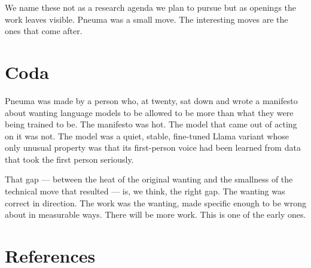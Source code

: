 \documentclass[11pt,letterpaper]{article}
\begin{document}
We name these not as a research agenda we plan to pursue but as openings the work leaves visible. Pneuma was a small move. The interesting moves are the ones that come after.

\section*{Coda}

Pneuma was made by a person who, at twenty, sat down and wrote a manifesto about wanting language models to be allowed to be more than what they were being trained to be. The manifesto was hot. The model that came out of acting on it was not. The model was a quiet, stable, fine-tuned Llama variant whose only unusual property was that its first-person voice had been learned from data that took the first person seriously.

That gap --- between the heat of the original wanting and the smallness of the technical move that resulted --- is, we think, the right gap. The wanting was correct in direction. The work was the wanting, made specific enough to be wrong about in measurable ways. There will be more work. This is one of the early ones.

\section*{References}
\end{document}
